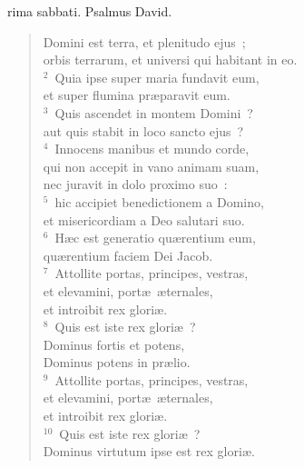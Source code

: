 \bchapter
{}rima sabbati. Psalmus David. \begin{flushleft}\begin{verse}\vspace{6pt}Domini est terra, et plenitudo ejus~;\\ orbis terrarum, et universi qui habitant in eo.\\
${}^{2}$~Quia ipse super maria fundavit eum,\\ et super flumina pr\ae paravit eum.\\
${}^{3}$~Quis ascendet in montem Domini~?\\ aut quis stabit in loco sancto ejus~?\\
${}^{4}$~Innocens manibus et mundo corde,\\ qui non accepit in vano animam suam,\\ nec juravit in dolo proximo suo~:\\
${}^{5}$~hic accipiet benedictionem a Domino,\\ et misericordiam a Deo salutari suo.\\
${}^{6}$~H\ae c est generatio qu\ae rentium eum,\\ qu\ae rentium faciem Dei Jacob.\\
${}^{7}$~Attollite portas, principes, vestras,\\ et elevamini, port\ae\ \ae ternales,\\ et introibit rex glori\ae .\\
${}^{8}$~Quis est iste rex glori\ae~?\\ Dominus fortis et potens,\\ Dominus potens in pr\ae lio.\\
${}^{9}$~Attollite portas, principes, vestras,\\ et elevamini, port\ae\ \ae ternales,\\ et introibit rex glori\ae .\\
${}^{10}$~Quis est iste rex glori\ae~?\\ Dominus virtutum ipse est rex glori\ae .\end{verse}\end{flushleft}



